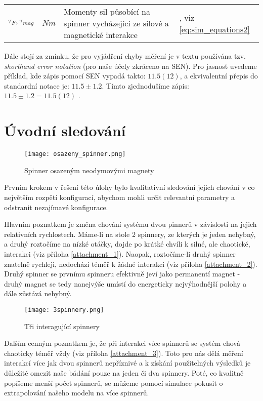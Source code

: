 \documentclass[12pt, a4paper,
 twoside,        %
 openright
]{report}
\begin{document}
\begin{table}[!ht]
\begin{tabularx}{\textwidth}{m{} m{} p{} p{4cm} }
        $\tau_F, \tau_{mag}$                 & $Nm$
                                             & Momenty sil působící na spinner vycházející ze silové a magnetické interakce & \cite{magnetic_torque,torque_def}, viz \autoref{eq:sim_equations2}                                                                   \\
    \end{tabularx}
\end{table}

Dále stojí za zmínku, že pro vyjádření chyby měření je v textu používána tzv. \textit{shorthand error notation} \cite{shorthand_error_notation} (pro naše účely zkráceno na SEN). Pro jasnost uvedeme příklad, kde zápis pomocí SEN vypadá takto: $11.5(12)$, a ekvivalentní přepis do standardní notace je: $11.5 \pm 1.2$. Tímto zjednodušíme zápis: $11.5 \pm 1.2 = 11.5(12)$ \cite{shorthand_error_notation_stack_exchange}.

\chapter{Úvodní sledování}
\begin{wrapfigure}{r}{0.4\textwidth}
    \vspace*{1cm}
    \texttt{[image: osazeny\_spinner.png]}
    \centering
    \caption{Spinner osazeným neodymovými magnety}
    \label{fig:1spinner}
\end{wrapfigure}

Prvním krokem v řešení této úlohy bylo kvalitativní sledování jejich chování v co největším rozpětí konfigurací, abychom mohli určit relevantní parametry a odstranit nezajímavé konfigurace.

Hlavním poznatkem je změna chování systému dvou pinnerů v závislosti na jejich relativních rychlostech.
Máme-li na stole 2 spinnery, ze kterých je jeden nehybný, a druhý roztočíme na nízké otáčky, dojde po krátké chvíli k silné, ale chaotické, interakci (viz příloha \ref{attachment_1}).
Naopak, roztočíme-li druhý spinner znatelně rychleji, nedochází téměř k žádné interakci (viz příloha \ref{attachment_2}).
Druhý spinner se prvnímu spinneru efektivně jeví jako permanentí magnet - druhý magnet se tedy nanejvýše umístí do energeticky nejvýhodnější polohy a dále zůstává nehybný.

\begin{wrapfigure}{l}{0.45\textwidth}
    \vspace*{0.5cm}
    \texttt{[image: 3spinnery.png]}
    \centering
    \caption{Tři interagující spinnery}
    \label{fig:3spinners}
\end{wrapfigure}
Dalším cenným poznatkem je, že při interakci více spinnerů se systém chová chaoticky téměř vždy (viz příloha \ref{attachment_3}).
Toto pro nás dělá měření interakcí více jak dvou spinnerů nepříznivé a k získání použitelných výsledků je důležité omezit naše bádání pouze na jeden či dva spinnery.
Poté, co kvalitně popíšeme menší počet spinnerů, se můžeme pomocí simulace pokusit o extrapolování našeho modelu na více spinnerů.
\end{document}
